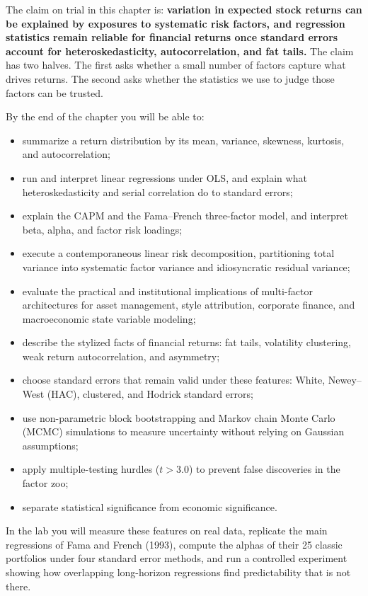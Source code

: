 The claim on trial in this chapter is: \textbf{variation in expected stock returns can be explained by exposures to systematic risk factors, and regression statistics remain reliable for financial returns once standard errors account for heteroskedasticity, autocorrelation, and fat tails.} The claim has two halves. The first asks whether a small number of factors capture what drives returns. The second asks whether the statistics we use to judge those factors can be trusted.

By the end of the chapter you will be able to:
\begin{itemize}
  \item summarize a return distribution by its mean, variance, skewness, kurtosis, and autocorrelation;
  \item run and interpret linear regressions under OLS, and explain what heteroskedasticity and serial correlation do to standard errors;
  \item explain the CAPM and the Fama--French three-factor model, and interpret beta, alpha, and factor risk loadings;
  \item execute a contemporaneous linear risk decomposition, partitioning total variance into systematic factor variance and idiosyncratic residual variance;
  \item evaluate the practical and institutional implications of multi-factor architectures for asset management, style attribution, corporate finance, and macroeconomic state variable modeling;
  \item describe the stylized facts of financial returns: fat tails, volatility clustering, weak return autocorrelation, and asymmetry;
  \item choose standard errors that remain valid under these features: White, Newey--West (HAC), clustered, and Hodrick standard errors;
  \item use non-parametric block bootstrapping and Markov chain Monte Carlo (MCMC) simulations to measure uncertainty without relying on Gaussian assumptions;
  \item apply multiple-testing hurdles ($t > 3.0$) to prevent false discoveries in the factor zoo;
  \item separate statistical significance from economic significance.
\end{itemize}

In the lab you will measure these features on real data, replicate the main regressions of Fama and French (1993), compute the alphas of their 25 classic portfolios under four standard error methods, and run a controlled experiment showing how overlapping long-horizon regressions find predictability that is not there.

